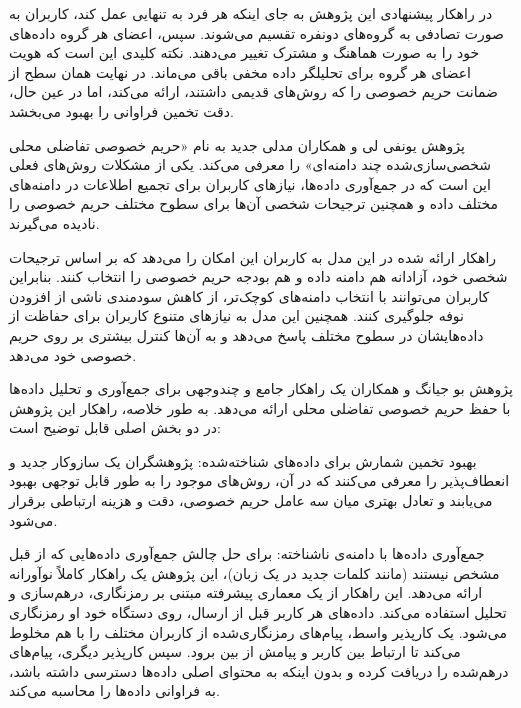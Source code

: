 در راهکار پیشنهادی این پژوهش به جای اینکه هر فرد به تنهایی عمل کند، کاربران به صورت تصادفی به گروه‌های دونفره تقسیم می‌شوند. سپس، اعضای هر گروه داده‌های خود را به صورت هماهنگ و مشترک تغییر می‌دهند. نکته کلیدی این است که هویت اعضای هر گروه برای تحلیلگر داده مخفی باقی می‌ماند. در نهایت همان سطح از ضمانت حریم خصوصی را که روش‌های قدیمی داشتند، ارائه می‌کند، اما در عین حال، دقت تخمین فراوانی را بهبود می‌بخشد.


پژوهش یونفی لی و همکاران  مدلی جدید به نام «حریم خصوصی تفاضلی محلی شخصی‌سازی‌شده چند دامنه‌ای» را معرفی می‌کند. یکی از مشکلات روش‌های فعلی این است که در جمع‌آوری داده‌ها، نیازهای کاربران برای تجمیع اطلاعات در دامنه‌های مختلف داده و همچنین ترجیحات شخصی آن‌ها برای سطوح مختلف حریم خصوصی را نادیده می‌گیرند.

راهکار ارائه شده در این مدل به کاربران این امکان را می‌دهد که بر اساس ترجیحات شخصی خود، آزادانه هم دامنه داده و هم بودجه حریم خصوصی را انتخاب کنند. بنابراین کاربران می‌توانند با انتخاب دامنه‌های کوچک‌تر، از کاهش سودمندی ناشی از افزودن نوفه جلوگیری کنند. همچنین این مدل به نیازهای متنوع کاربران برای حفاظت از داده‌هایشان در سطوح مختلف پاسخ می‌دهد و به آن‌ها کنترل بیشتری بر روی حریم خصوصی خود می‌دهد.


پژوهش بو جیانگ و همکاران  یک راهکار جامع و چندوجهی برای جمع‌آوری و تحلیل داده‌ها با حفظ حریم خصوصی تفاضلی محلی ارائه می‌دهد. به طور خلاصه، راهکار این پژوهش در دو بخش اصلی قابل توضیح است:


 بهبود تخمین شمارش برای داده‌های شناخته‌شده: پژوهشگران یک سازوکار جدید و انعطاف‌پذیر را معرفی می‌کنند که در آن، روش‌های موجود را به طور قابل توجهی بهبود می‌یابند و تعادل بهتری میان سه عامل حریم خصوصی، دقت و هزینه ارتباطی برقرار می‌شود.

 جمع‌آوری داده‌ها با دامنه‌ی ناشناخته: برای حل چالش جمع‌آوری داده‌هایی که از قبل مشخص نیستند (مانند کلمات جدید در یک زبان)، این پژوهش یک راهکار کاملاً نوآورانه ارائه می‌دهد. این راهکار از یک معماری پیشرفته مبتنی بر رمزنگاری، درهم‌سازی و تحلیل  استفاده می‌کند. داده‌های هر کاربر قبل از ارسال، روی دستگاه خود او رمزنگاری می‌شود. یک کارپذیر واسط، پیام‌های رمزنگاری‌شده از کاربران مختلف را با هم مخلوط می‌کند تا ارتباط بین کاربر و پیامش از بین برود. سپس کارپذیر دیگری، پیام‌های درهم‌شده را دریافت کرده و بدون اینکه به محتوای اصلی داده‌ها دسترسی داشته باشد، به فراوانی داده‌ها را محاسبه می‌کند.

